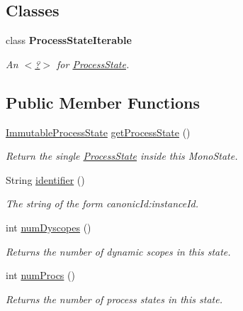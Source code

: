 \subsection*{Classes}
\begin{DoxyCompactItemize}
\item 
class {\bfseries Process\+State\+Iterable}
\begin{DoxyCompactList}\small\item\em An \hyperlink{}{$<$?$>$} for \hyperlink{}{Process\+State}. \end{DoxyCompactList}\end{DoxyCompactItemize}
\subsection*{Public Member Functions}
\begin{DoxyCompactItemize}
\item 
\hyperlink{classedu_1_1udel_1_1cis_1_1vsl_1_1civl_1_1state_1_1common_1_1immutable_1_1ImmutableProcessState}{Immutable\+Process\+State} \hyperlink{classedu_1_1udel_1_1cis_1_1vsl_1_1civl_1_1state_1_1common_1_1immutable_1_1ImmutableMonoState_a47aff836c4736874adbd036610cd077d}{get\+Process\+State} ()
\begin{DoxyCompactList}\small\item\em Return the single \hyperlink{}{Process\+State} inside this Mono\+State. \end{DoxyCompactList}\item 
String \hyperlink{classedu_1_1udel_1_1cis_1_1vsl_1_1civl_1_1state_1_1common_1_1immutable_1_1ImmutableMonoState_a1990d2b6ca9431801c5f82503fe7a49a}{identifier} ()
\begin{DoxyCompactList}\small\item\em The string of the form canonic\+Id\+:instance\+Id. \end{DoxyCompactList}\item 
int \hyperlink{classedu_1_1udel_1_1cis_1_1vsl_1_1civl_1_1state_1_1common_1_1immutable_1_1ImmutableMonoState_a2acae2194bec6b4ce820c45660ecae71}{num\+Dyscopes} ()
\begin{DoxyCompactList}\small\item\em Returns the number of dynamic scopes in this state. \end{DoxyCompactList}\item 
int \hyperlink{classedu_1_1udel_1_1cis_1_1vsl_1_1civl_1_1state_1_1common_1_1immutable_1_1ImmutableMonoState_a52cbe6709e1666084437fad01d81f09b}{num\+Procs} ()
\begin{DoxyCompactList}\small\item\em Returns the number of process states in this state. \end{DoxyCompactList}\item 

\end{DoxyCompactItemize}
